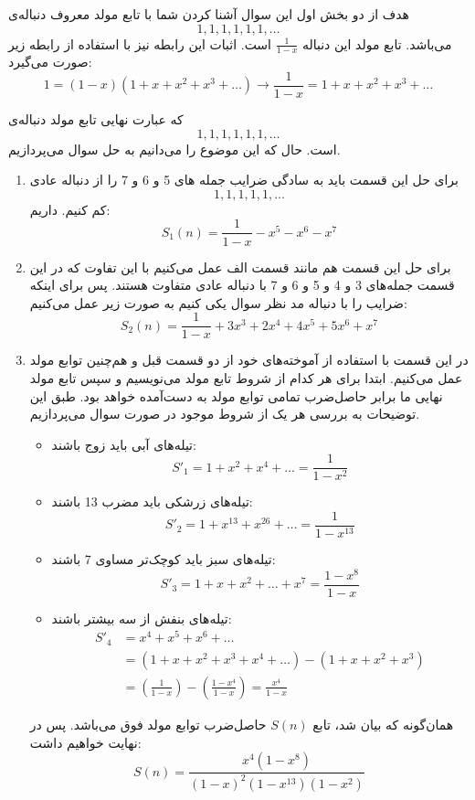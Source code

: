         هدف از دو بخش اول این سوال آشنا کردن شما با تابع مولد معروف دنباله‌ی 
        $${1,1,1,1,1,1,\ldots}$$
        می‌باشد.
        تابع مولد این دنباله $\frac{1}{1-x}$ است. اثبات این رابطه نیز با استفاده از رابطه زیر صورت می‌گیرد:
        $$1 = (1-x)(1+x+x^2+x^3+\ldots) \rightarrow \frac{1}{1-x} = 1+x+x^2+x^3+\ldots$$
        
        که عبارت نهایی تابع مولد دنباله‌ی 
        $${1,1,1,1,1,1,\ldots}$$
        است.
        حال که این موضوع را می‌دانیم به حل سوال می‌پردازیم.
        \begin{enumerate}
            \item 
            برای حل این قسمت باید به سادگی ضرایب جمله های 5 و 6 و 7 را از دنباله عادی
            $${1,1,1,1,1,\ldots}$$
            کم کنیم. داریم:
            $$S_{1}(n) = \frac{1}{1-x} - x^5 - x^6 - x^7$$
            \item
            برای حل این قسمت هم مانند قسمت الف عمل می‌کنیم با این تفاوت که در این قسمت جمله‌های 3 و 4 و 5 و 6 و 7 با دنباله عادی متفاوت هستند. پس برای اینکه ضرایب را با دنباله مد نظر سوال یکی کنیم به صورت زیر عمل می‌کنیم:
            $$S_{2}(n) = \frac{1}{1-x} + 3x^3 + 2x^4 + 4x^5 + 5x^6 + x^7$$
        \item
        در این قسمت با استفاده از آموخته‌های خود از دو قسمت قبل و هم‌چنین توابع مولد عمل می‌کنیم. ابتدا برای هر کدام از شروط تابع مولد می‌نویسیم و سپس تابع مولد نهایی ما برابر حاصل‌ضرب تمامی  توابع مولد  به دست‌آمده خواهد بود.
        طبق این توضیحات به بررسی هر یک از شروط موجود در صورت سوال می‌پردازیم.
        \begin{itemize}
            \item 
            تیله‌های آبی باید زوج باشند:
            $$S'_{1} = 1 + x^2 + x^4 + \ldots = \frac{1}{1-x^2}$$
            \item
            تیله‌های زرشکی باید مضرب 13 باشند:
            $$S'_{2} = 1 + x^{13} + x^{26} + \ldots = \frac{1}{1-x^{13}}$$
            \item
            تیله‌های سبز باید کوچک‌تر مساوی 7 باشند:
            $$S'_{3} = 1 + x + x^2 + \ldots + x^7 = \frac{1-x^8}{1-x}$$
            \item
            تیله‌های بنفش از سه بیشتر باشند:
            \begin{align*}
            S'_{4} &= x^4 + x^5 + x^6 + \ldots\\
            &= (1+x+x^2+x^3+x^4+\ldots) - (1 + x + x^2 + x^3)\\
            &= (\frac{1}{1-x}) - (\frac{1-x^4}{1-x}) = \frac{x^4}{1-x}
            \end{align*}
        \end{itemize}
        همان‌گونه که بیان شد، تابع 
        $S(n)$
        حاصل‌ضرب توابع مولد فوق می‌باشد. پس در نهایت خواهیم داشت:
        $$S(n) = \frac{x^4(1-x^8)}{(1-x)^2(1-x^{13})(1-x^{2})}$$
        \end{enumerate}